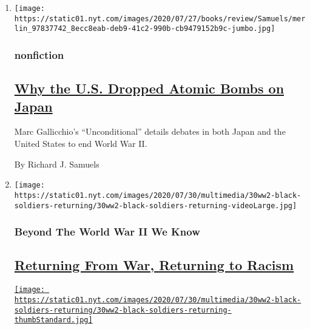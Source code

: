 \begin{enumerate}
\def\labelenumi{\arabic{enumi}.}
\item
  \texttt{[image: https://static01.nyt.com/images/2020/07/27/books/review/Samuels/merlin\_97837742\_8ecc8eab-deb9-41c2-990b-cb9479152b9c-jumbo.jpg]}

  \hypertarget{nonfiction}{%
  \subsubsection{nonfiction}\label{nonfiction}}

  \hypertarget{why-the-us-dropped-atomic-bombs-on-japan}{%
  \subsection{\texorpdfstring{\href{/2020/08/03/books/review/unconditional-marc-gallicchio.html}{Why
  the U.S. Dropped Atomic Bombs on
  Japan}}{Why the U.S. Dropped Atomic Bombs on Japan}}\label{why-the-us-dropped-atomic-bombs-on-japan}}

  Marc Gallicchio's ``Unconditional'' details debates in both Japan and
  the United States to end World War II.

  By Richard J. Samuels
\item
  \texttt{[image: https://static01.nyt.com/images/2020/07/30/multimedia/30ww2-black-soldiers-returning/30ww2-black-soldiers-returning-videoLarge.jpg]}

  \hypertarget{beyond-the-world-war-ii-we-know-1}{%
  \subsubsection{Beyond The World War II We
  Know}\label{beyond-the-world-war-ii-we-know-1}}

  \hypertarget{returning-from-war-returning-to-racism}{%
  \subsection{\texorpdfstring{\href{/2020/07/30/magazine/black-soldiers-wwii-racism.html}{Returning
  From War, Returning to
  Racism}}{Returning From War, Returning to Racism}}\label{returning-from-war-returning-to-racism}}

  \href{/2020/07/30/magazine/black-soldiers-wwii-racism.html}{\texttt{[image: https://static01.nyt.com/images/2020/07/30/multimedia/30ww2-black-soldiers-returning/30ww2-black-soldiers-returning-thumbStandard.jpg]}}


\end{enumerate}
